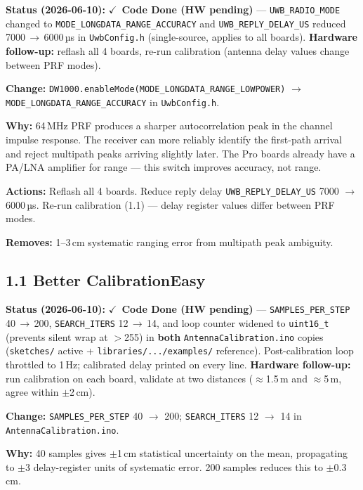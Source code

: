 \documentclass[11pt,a4paper]{article}
\newcommand{\dif}[1]{\texorpdfstring{\hfill#1}{}}
\newcommand{\easy}{\textcolor{dkgreen}{\textbf{Easy}}}
\newcommand{\codehwdone}{\texorpdfstring{\textcolor{dkorange}{$\checkmark$~\textbf{Code Done (HW pending)}}}{[Code Done, HW pending]}}
\begin{document}
\begin{codehwbox}
\textbf{Status (2026-06-10):} \codehwdone{} --- \texttt{UWB\_RADIO\_MODE} changed to \texttt{MODE\_LONGDATA\_RANGE\_ACCURACY} and \texttt{UWB\_REPLY\_DELAY\_US} reduced 7000\,$\to$\,6000\,µs in \texttt{UwbConfig.h} (single-source, applies to all boards). \textbf{Hardware follow-up:} reflash all 4 boards, re-run calibration (antenna delay values change between PRF modes).
\end{codehwbox}

\textbf{Change:} \texttt{DW1000.enableMode(MODE\_LONGDATA\_RANGE\_LOWPOWER)} $\to$ \texttt{MODE\_LONGDATA\_RANGE\_ACCURACY} in \texttt{UwbConfig.h}.

\textbf{Why:} 64\,MHz PRF produces a sharper autocorrelation peak in the channel impulse response. The receiver can more reliably identify the first-path arrival and reject multipath peaks arriving slightly later. The Pro boards already have a PA/LNA amplifier for range --- this switch improves accuracy, not range.

\textbf{Actions:} Reflash all 4 boards. Reduce reply delay \texttt{UWB\_REPLY\_DELAY\_US} 7000 $\to$ 6000\,µs. Re-run calibration (1.1) --- delay register values differ between PRF modes.

\textbf{Removes:} 1--3\,cm systematic ranging error from multipath peak ambiguity.

\subsection{1.1 Better Calibration\dif{\easy}}

\begin{codehwbox}
\textbf{Status (2026-06-10):} \codehwdone{} --- \texttt{SAMPLES\_PER\_STEP} 40\,$\to$\,200, \texttt{SEARCH\_ITERS} 12\,$\to$\,14, and loop counter widened to \texttt{uint16\_t} (prevents silent wrap at $>$255) in \textbf{both} \texttt{AntennaCalibration.ino} copies (\texttt{sketches/} active + \texttt{libraries/.../examples/} reference). Post-calibration loop throttled to 1\,Hz; calibrated delay printed on every line. \textbf{Hardware follow-up:} run calibration on each board, validate at two distances ($\approx$1.5\,m and $\approx$5\,m, agree within $\pm$2\,cm).
\end{codehwbox}

\textbf{Change:} \texttt{SAMPLES\_PER\_STEP} 40 $\to$ 200; \texttt{SEARCH\_ITERS} 12 $\to$ 14 in \texttt{AntennaCalibration.ino}.

\textbf{Why:} 40 samples gives $\pm$1\,cm statistical uncertainty on the mean, propagating to $\pm$3 delay-register units of systematic error. 200 samples reduces this to $\pm$0.3\,cm.
\end{document}
